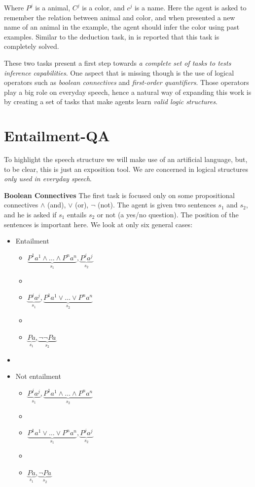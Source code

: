 Where $P^{j}$ is a animal, $C^{j}$ is a color, and $c^{j}$ is a name. Here the agent is asked to remember the relation between animal and color, and when presented a new name of an animal in the example, the agent should infer the color using past examples. Similar to the deduction task, in \cite{WestonBCM15} is reported that this task is completely solved.

These two tasks present a first step towards \textit{a complete set of tasks to tests inference capabilities}. One aspect that is missing though is the use of logical operators such as \textit{boolean connectives} and \textit{first-order quantifiers}. Those operators play a big role on everyday speech, hence a natural way of expanding this work is by creating a set of tasks that make agents learn \textit{valid logic structures}.

\section{Entailment-QA}
\label{ch:03-EQA}

To highlight the speech structure we will make use of an artificial language, but, to be clear, this is just an exposition tool. We are concerned in logical structures \textit{only used in everyday speech}.

\textbf{Boolean Connectives} The first task is focused only on some propositional connectives $\land$ (and), $\lor$ (or), $\lnot$ (not). The agent is given two sentences $s_1$ and $s_2$, and he is asked if $s_1$ entails $s_2$ or not (a yes/no question). The position of the sentences is important here. We look at only six general cases:

\begin{itemize}
\item Entailment
\begin{itemize}
\item $\underbrace{P^{1}a^1 \land \dots \land P^{n}a^n}_{s_1}, \underbrace{P^{j}a^j}_{s_2}$ 
\item[]
\item $\underbrace{P^{j}a^j}_{s_1}, \underbrace{P^{1}a^1 \lor \dots \lor P^{n}a^n}_{s_2}$
\item[]
\item $\underbrace{Pa}_{s_1}, \underbrace{\lnot \lnot Pa}_{s_2}$
\end{itemize}
\item[]

\item Not entailment
\begin{itemize}
\item $\underbrace{P^{j}a^j}_{s_1}, \underbrace{P^{1}a^1 \land \dots \land P^{n}a^n}_{s_2}$
\item[]
\item $\underbrace{P^{1}a^1 \lor \dots \lor P^{n}a^n}_{s_1}, \underbrace{P^{j}a^j}_{s_2}$
\item[]
\item $\underbrace{Pa}_{s_1}, \underbrace{\lnot Pa}_{s_2}$
\end{itemize}
\end{itemize}

